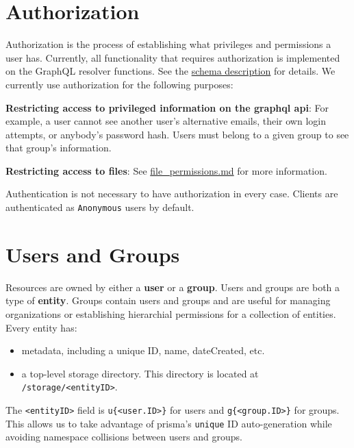 \hypertarget{authorization}{%
\section{Authorization}\label{authorization}}

Authorization is the process of establishing what privileges and
permissions a user has. Currently, all functionality that requires
authorization is implemented on the GraphQL resolver functions. See the
\href{/docs/backend.md}{schema description} for details. We currently
use authorization for the following purposes:

\textbf{Restricting access to privileged information on the graphql
api}: For example, a user cannot see another user's alternative emails,
their own login attempts, or anybody's password hash. Users must belong
to a given group to see that group's information.

\textbf{Restricting access to files}: See
\href{/docs/file_permissions.md}{file\_permissions.md} for more
information.

Authentication is not necessary to have authorization in every case.
Clients are authenticated as \texttt{Anonymous} users by default.

\hypertarget{users-and-groups}{%
\section{Users and Groups}\label{users-and-groups}}

Resources are owned by either a \textbf{user} or a \textbf{group}. Users
and groups are both a type of \textbf{entity}. Groups contain users and
groups and are useful for managing organizations or establishing
hierarchial permissions for a collection of entities. Every entity has:

\begin{itemize}
\tightlist
\item
  metadata, including a unique ID, name, dateCreated, etc.
\item
  a top-level storage directory. This directory is located at
  \texttt{/storage/\textless{}entityID\textgreater{}}.
\end{itemize}

The \texttt{\textless{}entityID\textgreater{}} field is
\texttt{u\{\textless{}user.ID\textgreater{}\}} for users and
\texttt{g\{\textless{}group.ID\textgreater{}\}} for groups. This allows
us to take advantage of prisma's \texttt{unique} ID auto-generation
while avoiding namespace collisions between users and groups.

